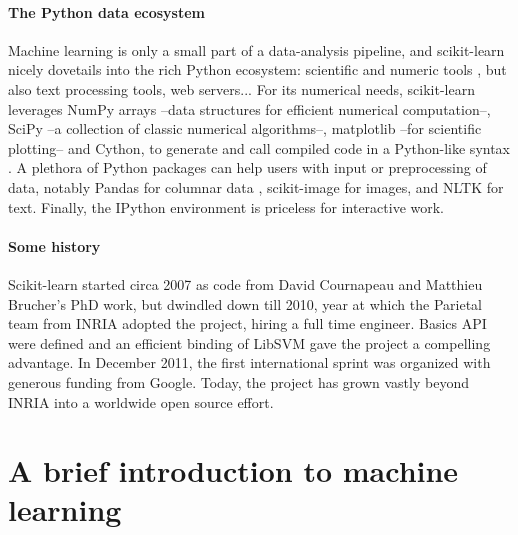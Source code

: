 \documentclass[a4paper]{article}
\begin{document}
\paragraph{The Python data ecosystem}
%
Machine learning is only a small part of a data-analysis pipeline, and
scikit-learn nicely dovetails into the rich Python ecosystem: scientific
and numeric tools \cite{oliphant2007python,varoquaux2013scipy}, but also
text processing tools, web servers...
%
For its numerical needs, scikit-learn leverages NumPy arrays
\cite{vanderwalt2011} --data structures for efficient numerical
computation--, SciPy --a collection of classic numerical algorithms--,
matplotlib \cite{hunter2007matplotlib} --for scientific plotting-- and
Cython, to generate and call compiled code in a Python-like syntax
\cite{behnel2011cython}.
%
A plethora of Python packages can help users with input or preprocessing
of data, notably Pandas for columnar data \cite{mckinney2012}, scikit-image
for images, and NLTK for text. Finally, the IPython environment
\cite{perez2007ipython} is priceless for interactive work.

\paragraph{Some history}
%
Scikit-learn started circa 2007 as code from David Cournapeau and
Matthieu Brucher's PhD work, but dwindled down till 2010, year at which the
Parietal team from INRIA adopted the project, hiring a full time
engineer. Basics API were defined and an efficient binding of LibSVM
\cite{chang2011libsvm} gave the project a compelling advantage. In
December 2011, the first international sprint was organized with generous
funding from Google. Today, the project has grown vastly beyond
INRIA into a worldwide open source effort.

\section{A brief introduction to machine learning}
\end{document}
